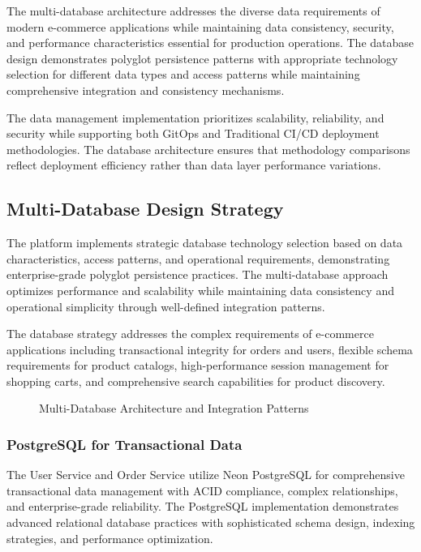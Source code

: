The multi-database architecture addresses the diverse data requirements of modern e-commerce applications while maintaining data consistency, security, and performance characteristics essential for production operations. The database design demonstrates polyglot persistence patterns with appropriate technology selection for different data types and access patterns while maintaining comprehensive integration and consistency mechanisms.

The data management implementation prioritizes scalability, reliability, and security while supporting both GitOps and Traditional CI/CD deployment methodologies. The database architecture ensures that methodology comparisons reflect deployment efficiency rather than data layer performance variations.

\subsection{Multi-Database Design Strategy}

The platform implements strategic database technology selection based on data characteristics, access patterns, and operational requirements, demonstrating enterprise-grade polyglot persistence practices. The multi-database approach optimizes performance and scalability while maintaining data consistency and operational simplicity through well-defined integration patterns.

The database strategy addresses the complex requirements of e-commerce applications including transactional integrity for orders and users, flexible schema requirements for product catalogs, high-performance session management for shopping carts, and comprehensive search capabilities for product discovery.

\begin{figure}[H]
\centering
\caption{Multi-Database Architecture and Integration Patterns}
\label{fig:multi-database-architecture}
\end{figure}

\subsubsection{PostgreSQL for Transactional Data}

The User Service and Order Service utilize Neon PostgreSQL for comprehensive transactional data management with ACID compliance, complex relationships, and enterprise-grade reliability. The PostgreSQL implementation demonstrates advanced relational database practices with sophisticated schema design, indexing strategies, and performance optimization.

